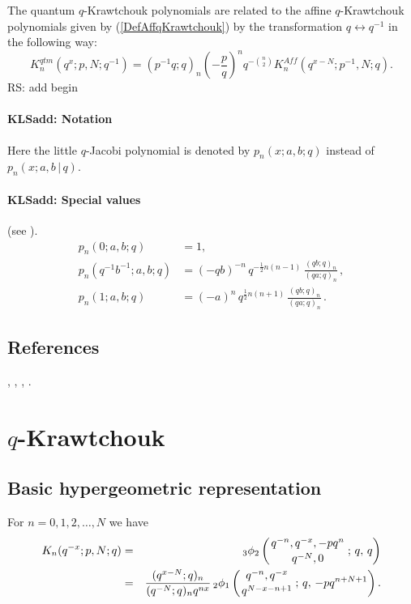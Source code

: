 \documentclass[envcountchap,graybox]{svmono}
\newcommand{\qhyp}[5]{\mbox{}_{#1}{\phi}_{#2}
\left(\genfrac{}{}{0pt}{}{#3}{#4}\,;\,q,\,#5\right)}
\newcommand\half{\frac12}
\newcommand{\qhyp}[5]{\,\mbox{}_{#1}\phi_{#2}\!\left(
  \genfrac{}{}{0pt}{}{#3}{#4};#5\right)}
\begin{document}
\noindent
The quantum $q$-Krawtchouk polynomials are related to the affine
$q$-Krawtchouk polynomials given by (\ref{DefAffqKrawtchouk})
by the transformation $q\leftrightarrow q^{-1}$ in the following way:
$$K_n^{qtm}(q^x;p,N;q^{-1})=(p^{-1}q;q)_n\left(-\frac{p}{q}\right)^nq^{-\binom{n}{2}}
K_n^{Aff}(q^{x-N};p^{-1},N;q).$$
 RS: add begin\label{sec14.12}
%
\paragraph{\large\bf KLSadd: Notation}Here the little $q$-Jacobi polynomial is denoted by
$p_n(x;a,b;q)$ instead of
$p_n(x;a,b\,|\, q)$.
%
\paragraph{\large\bf KLSadd: Special values}(see \cite[\S2.4]{K17}).
\begin{align}
p_n(0;a,b;q)&=1,\label{127}\\
p_n(q^{-1}b^{-1};a,b;q)&=(-qb)^{-n}\,q^{-\half n(n-1)}\,\frac{(qb;q)_n}{(qa;q)_n}\,,\label{128}\\
p_n(1;a,b;q)&=(-a)^n\,q^{\half n(n+1)}\,\frac{(qb;q)_n}{(qa;q)_n}\,.\label{129}
\end{align}
%

\subsection*{References}
\cite{GasperRahman90}, \cite{Koorn89III}, \cite{Koorn90II}, \cite{Smirnov}.


\section{$q$-Krawtchouk}
\par\setcounter{equation}{0}

\subsection*{Basic hypergeometric representation} For $n=0,1,2,\ldots,N$ we have
\begin{eqnarray}
\label{DefqKrawtchouk}
K_n(q^{-x};p,N;q)&=&\qhyp{3}{2}{q^{-n},q^{-x},-pq^n}{q^{-N},0}{q}\\
&=&\frac{(q^{x-N};q)_n}{(q^{-N};q)_nq^{nx}}\,
\qhyp{2}{1}{q^{-n},q^{-x}}{q^{N-x-n+1}}{-pq^{n+N+1}}.\nonumber
\end{eqnarray}
\end{document}
